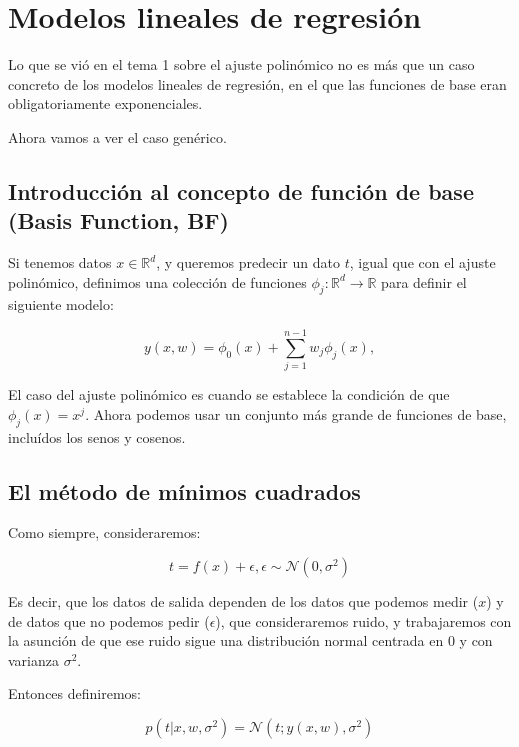 

\section{Modelos lineales de regresión}
Lo que se vió en el tema 1 sobre el ajuste polinómico no es más que un caso concreto de los modelos lineales de regresión,
en el que las funciones de base eran obligatoriamente exponenciales.

Ahora vamos a ver el caso genérico.

\subsection{Introducción al concepto de función de base (Basis Function, BF)}
Si tenemos datos $x \in \mathbb{R}^d$, y queremos predecir un dato $t$, igual que con el ajuste polinómico, definimos una colección de funciones $\phi_j: \mathbb{R}^d \rightarrow \mathbb{R}$ para definir el siguiente modelo:


\begin{equation*}
y(x,w) = \phi_0(x) + \sum_{j = 1}^{n-1} w_j\phi_j(x),
\end{equation*}

El caso del ajuste polinómico es cuando se establece la condición de que $\phi_j(x) = x^j$. Ahora podemos usar un conjunto
más grande de funciones de base, incluídos los senos y cosenos.

\subsection{El método de mínimos cuadrados}
Como siempre, consideraremos:

\begin{equation*}
t = f(x) + \epsilon, \epsilon \sim \mathcal{N}(0, \sigma^2)
\end{equation*}

Es decir, que los datos de salida dependen de los datos que podemos medir ($x$) y de datos que no podemos pedir ($\epsilon$), que consideraremos ruido, y trabajaremos con la asunción de que ese ruido sigue una distribución normal centrada en $0$ y con varianza $\sigma^2$.

Entonces definiremos:

\begin{equation*}
p(t | x, w, \sigma^2) = \mathcal{N}(t; y(x,w), \sigma^2)
\end{equation*}

